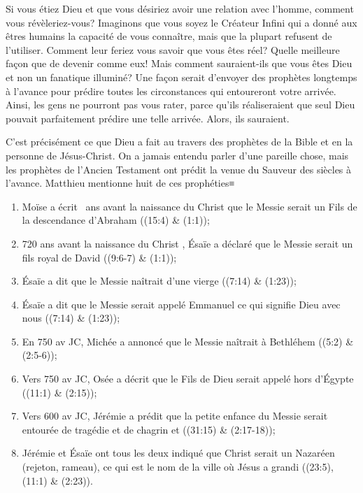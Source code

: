 

Si vous étiez Dieu et que vous désiriez avoir une relation avec l'homme, comment vous révèleriez-vous? Imaginons que vous soyez le Créateur Infini qui a donné aux êtres humains la capacité de vous connaître, mais que la plupart refusent de l'utiliser. Comment leur feriez vous savoir que vous êtes réel? Quelle meilleure façon que de devenir comme eux! Mais comment sauraient-ils que vous êtes Dieu et non un fanatique illuminé? Une façon serait d'envoyer des prophètes longtemps à l'avance pour prédire toutes les circonstances qui entoureront votre arrivée. Ainsi, les gens ne pourront pas vous rater, parce qu'ils réaliseraient que seul Dieu pouvait parfaitement prédire une telle arrivée. Alors, ils sauraient.

C'est précisément ce que Dieu a fait au travers des prophètes de la Bible et en la personne de Jésus-Christ. On a jamais entendu parler d'une pareille chose, mais les prophètes de l'Ancien Testament ont prédit la venue du Sauveur des siècles à l'avance. Matthieu mentionne huit de ces prophéties≡

\begin{enumerate}
        \item Moïse a écrit ~ans avant la naissance du Christ que le Messie serait un Fils de la descendance d'Abraham ((15:4) \& (1:1));
        \item 720 ans avant la naissance du Christ , Ésaïe a déclaré que le Messie serait un fils royal de David ((9:6-7) \& (1:1));
        \item Ésaïe a dit que le Messie naîtrait d'une vierge ((7:14) \& (1:23));
        \item Ésaïe a dit que le Messie serait appelé Emmanuel ce qui signifie \og Dieu avec nous \fg{} ((7:14) \& (1:23));
        \item En 750 av JC, Michée a annoncé que le Messie naîtrait à Bethléhem ((5:2) \& (2:5-6));
        \item Vers 750 av JC, Osée a décrit que le Fils de Dieu serait appelé hors d'Égypte ((11:1) \& (2:15));
        \item Vers 600 av JC, Jérémie a prédit que la petite enfance du Messie serait entourée de tragédie et de chagrin et ((31:15) \& (2:17-18));
        \item Jérémie et Ésaïe ont tous les deux indiqué que Christ serait un Nazaréen (rejeton, rameau), ce qui est le nom de la ville où Jésus a grandi ((23:5), (11:1) \& (2:23)).
\end{enumerate}

